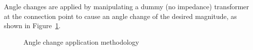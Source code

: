 Angle changes are applied by manipulating a dummy (no impedance) transformer at the connection point to cause an angle change of the desired magnitude, as shown in Figure~\ref{fig:smib-angpoc-disturbance-diagram}.

\begin{figure}[H]
	\centering
	
	\caption{Angle change application methodology}
	\label{fig:smib-angpoc-disturbance-diagram}
\end{figure}